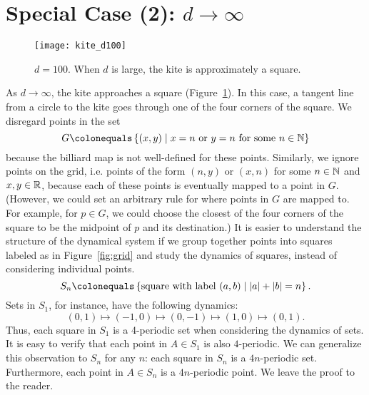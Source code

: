 \documentclass[12pt,twoside]{book}
\begin{document}
\section{Special Case (2): $d \to \infty$}
\begin{figure}[ht]
  \begin{center}
    \texttt{[image: kite\_d100]}
    \caption{$d = 100$. When $d$ is large, the kite is approximately a square.}
    \label{fig:kite-square}
  \end{center}
\end{figure}
As $d \to \infty$, the kite approaches a square (Figure~\ref{fig:kite-square}).
In this case, a tangent line from a circle to the kite goes through one of the four corners of the square.
We disregard points in the set 
\begin{equation*}
  G \ceq \setst{(x,y)}{x = n \mbox{ or } y = n \mbox{ for some } n \in \N}
\end{equation*}
 because the billiard map is not well-defined for these points.
Similarly, we ignore points on the grid, i.e. points of the form $(n,y)$ or $(x,n)$ for some $n \in \mathbb{N}$ and $x,y \in \mathbb{R}$, because each of these points is eventually mapped to a point in $G$.
(However, we could set an arbitrary rule for where points in $G$ are mapped to.
For example, for $p \in G$, we could choose the closest of the four corners of the square to be the midpoint of $p$ and its destination.)
It is easier to understand the structure of the dynamical system if we group together points into squares labeled as in Figure~\ref{fig:grid} and study the dynamics of squares, instead of considering individual points.
\begin{equation*}
  S_n \ceq \setst{\mbox{square with label } (a,b)}{\abs{a} + \abs{b} = n}.
\end{equation*}
Sets in $S_1$, for instance, have the following dynamics:
\begin{equation*}
  (0,1) \mapsto (-1,0) \mapsto (0,-1) \mapsto (1,0) \mapsto (0,1).
\end{equation*}
Thus, each square in $S_1$ is a 4-periodic set when considering the dynamics of sets.
It is easy to verify that each point in $A \in S_1$ is also $4$-periodic.
We can generalize this observation to $S_n$ for any $n$: each square in $S_n$ is a $4n$-periodic set.
Furthermore, each point in $A \in S_n$ is a $4n$-periodic point.
We leave the proof to the reader.
\end{document}
